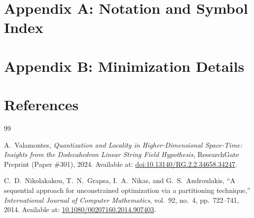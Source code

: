 \documentclass[11pt,oneside]{book}
\numberwithin{equation}{chapter}
\begin{document}
\chapter*{Appendix A: Notation and Symbol Index}

\chapter*{Appendix B: Minimization Details}

\chapter*{References}
\begin{thebibliography}{99}\setlength{\itemsep}{2pt}

A.~Valamontes, \emph{Quantization and Locality in Higher-Dimensional Space-Time:
Insights from the Dodecahedron Linear String Field Hypothesis}, ResearchGate Preprint (Paper \#301), 2024.
Available at: \href{http://dx.doi.org/10.13140/RG.2.2.34658.34247}{doi:10.13140/RG.2.2.34658.34247}.

C.~D.~Nikolakakou, T.~N.~Grapsa, I.~A.~Nikas, and G.~S.~Androulakis,
``A sequential approach for unconstrained optimization via a partitioning technique,''
\emph{International Journal of Computer Mathematics}, vol.~92, no.~4, pp.~722--741, 2014.
Available at: \href{https://doi.org/10.1080/00207160.2014.907403}{10.1080/00207160.2014.907403}.


\end{thebibliography}

\end{document}

